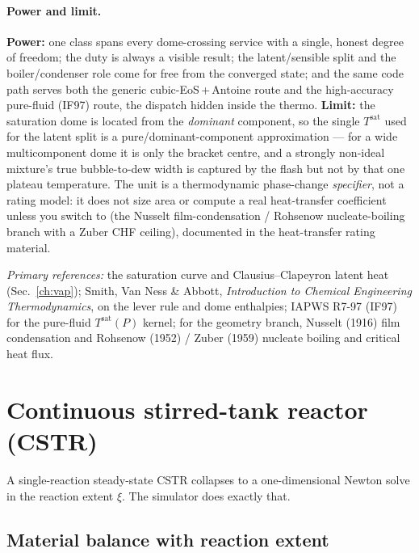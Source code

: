 \documentclass[11pt,a4paper]{article}
\begin{document}
\paragraph{Power and limit.}  \textbf{Power:} one class spans every dome-crossing
service with a single, honest degree of freedom; the duty is always a visible
result; the latent/sensible split and the boiler/condenser role come for free
from the converged state; and the same code path serves both the generic
cubic-EoS\,+\,Antoine route and the high-accuracy pure-fluid (IF97) route, the
dispatch hidden inside the thermo.  \textbf{Limit:} the saturation dome is
located from the \emph{dominant} component, so the single $T^{\mathrm{sat}}$ used
for the latent split is a pure/dominant-component approximation --- for a wide
multicomponent dome it is only the bracket centre, and a strongly non-ideal
mixture's true bubble-to-dew width is captured by the flash but not by that one
plateau temperature.  The unit is a thermodynamic phase-change \emph{specifier},
not a rating model: it does not size area or compute a real heat-transfer
coefficient unless you switch to  (the Nusselt
film-condensation / Rohsenow nucleate-boiling branch with a Zuber CHF ceiling),
documented in the heat-transfer rating material.

\medskip\noindent
\emph{Primary references:} the saturation curve and Clausius--Clapeyron latent
heat (Sec.~\ref{ch:vap}); Smith, Van Ness \& Abbott, \emph{Introduction to
Chemical Engineering Thermodynamics}, on the lever rule and dome enthalpies; IAPWS
R7-97 (IF97) for the pure-fluid $T^{\mathrm{sat}}(P)$ kernel; for the geometry
branch, Nusselt (1916) film condensation and Rohsenow (1952) / Zuber (1959)
nucleate boiling and critical heat flux.

\section{Continuous stirred-tank reactor (CSTR)}\label{ch:cstr}

\begin{whatyoulllearn}
A single-reaction steady-state CSTR collapses to a one-dimensional
Newton solve in the reaction extent $\xi$. The simulator does exactly
that.
\end{whatyoulllearn}

\subsection{Material balance with reaction extent}
\end{document}
